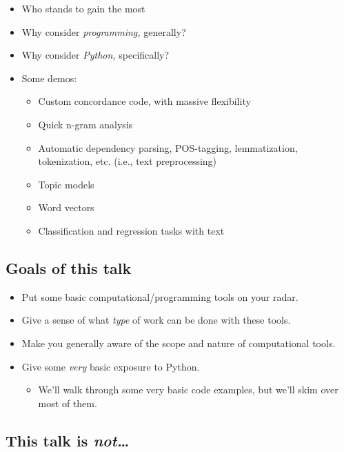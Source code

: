 \documentclass[11pt]{article}
\providecommand{\tightlist}{%
      \setlength{\itemsep}{0pt}\setlength{\parskip}{0pt}}
\begin{document}
\begin{itemize}
\tightlist
\item
  Who stands to gain the most
\item
  Why consider \emph{programming,} generally?
\item
  Why consider \emph{Python,} specifically?
\item
  Some demos:

  \begin{itemize}
  \tightlist
  \item
    Custom concordance code, with massive flexibility
  \item
    Quick n-gram analysis
  \item
    Automatic dependency parsing, POS-tagging, lemmatization,
    tokenization, etc. (i.e., text preprocessing)
  \item
    Topic models
  \item
    Word vectors
  \item
    Classification and regression tasks with text
  \end{itemize}
\end{itemize}

    \hypertarget{goals-of-this-talk}{%
\subsection{Goals of this talk}\label{goals-of-this-talk}}

\begin{itemize}
\tightlist
\item
  Put some basic computational/programming tools on your radar.
\item
  Give a sense of what \emph{type} of work can be done with these tools.
\item
  Make you generally aware of the scope and nature of computational
  tools.
\item
  Give some \emph{very} basic exposure to Python.

  \begin{itemize}
  \tightlist
  \item
    We'll walk through some very basic code examples, but we'll skim
    over most of them.
  \end{itemize}
\end{itemize}

\hypertarget{this-talk-is-not}{%
\subsection{\texorpdfstring{This talk is
\emph{not\ldots{}}}{This talk is not\ldots{}}}\label{this-talk-is-not}}
\end{document}
